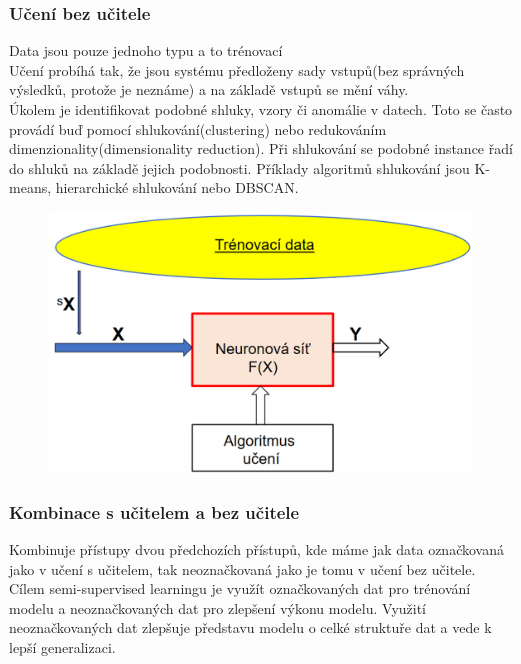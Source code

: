 \subsubsection{Učení bez učitele}
Data jsou pouze jednoho typu a to trénovací\\
Učení probíhá tak, že jsou systému předloženy sady vstupů(bez správných výsledků, protože je neznáme) a na základě vstupů se mění váhy.\\

Úkolem je identifikovat podobné shluky, vzory či anomálie v datech. Toto se často provádí buď pomocí shlukování(clustering) nebo redukováním dimenzionality(dimensionality reduction). Při shlukování se podobné instance řadí do shluků na základě jejich podobnosti. Příklady algoritmů shlukování jsou K-means, hierarchické shlukování nebo DBSCAN.

\begin{figure}[h!]
    \includegraphics[scale = 0.3]{images/bezUcitele.png}
\end{figure}

\subsubsection{Kombinace s učitelem a bez učitele}
Kombinuje přístupy dvou předchozích přístupů, kde máme jak data označkovaná jako v učení s učitelem, tak neoznačkovaná jako je tomu v učení bez učitele.\\

Cílem semi-supervised learningu je využít označkovaných dat pro trénování modelu a neoznačkovaných dat pro zlepšení výkonu modelu. Využití neoznačkovaných dat zlepšuje představu modelu o celké struktuře dat a vede k lepší generalizaci.\\

